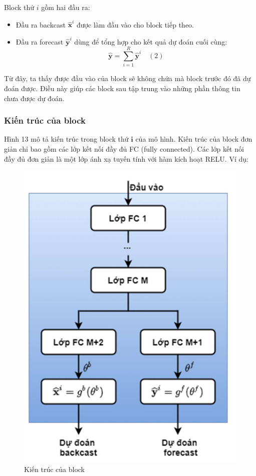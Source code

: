\documentclass[conference]{IEEEtran}
\begin{document}
Block thứ $i$ gồm hai đầu ra:
\begin{itemize}
    \item Đầu ra backcast $\hat{\mathbf{x}}^i$ được làm đầu vào cho block tiếp theo.
    \item Đầu ra forecast $\hat{\mathbf{y}}^i$ dùng để tổng hợp cho kết quả dự đoán cuối cùng:
          \[
              \hat{\mathbf{y}} = \sum_{i=1}^{R} \hat{\mathbf{y}}^i \quad (2)
          \]
\end{itemize}
Từ đây, ta thấy được đầu vào của block sẽ không chứa mà block trước đó đã dự đoán được. Điều này giúp các block sau tập trung vào những phần thông tin chưa được dự đoán.
\vspace{3mm}
\subsubsection{Kiến trúc của block}
Hình 13 mô tả kiến trúc trong block thứ $\mathbf{i}$ của mô hình. Kiến trúc của block đơn giản chỉ bao gồm các lớp kết nối đầy đủ FC (fully connected). Các lớp kết nối đầy đủ đơn giản là một lớp ánh xạ tuyến tính với hàm kích hoạt RELU. Ví dụ:
\begin{figure}[H]
    \centering
    \begin{minipage}{0.23\textwidth}
        \centering
        \includegraphics[width=1\textwidth]{bibliography/figure/N-BEATS/2.png}
        \caption{Kiến trúc của block}
        \label{fig:N-BEATS}
    \end{minipage}
\end{figure}
\end{document}
